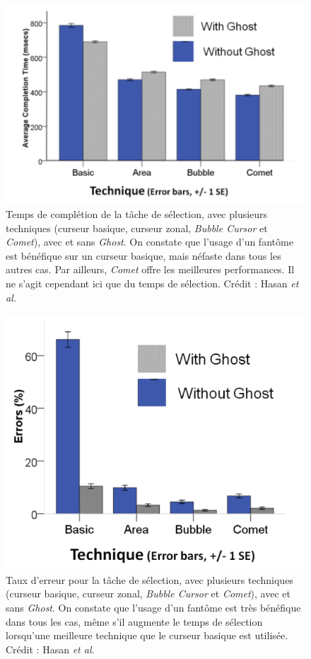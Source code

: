 	\begin{figure}[ht]
		\centering
		\includegraphics[width=\textwidth]{figures/cometGhostTimes}
		\caption{Temps de complétion de la tâche de sélection, avec plusieurs techniques (curseur basique, curseur zonal, \emph{Bubble Cursor} et \emph{Comet}), avec et sans \emph{Ghost}. On constate que l'usage d'un fantôme est bénéfique sur un curseur basique, mais néfaste dans tous les autres cas. Par ailleurs, \emph{Comet} offre les meilleures performances. Il ne s'agit cependant ici que du temps de sélection. Crédit : Hasan \emph{et al.}}
		\label{fig:cometGhostTimes}
	\end{figure}
	
	\begin{figure}[ht]
		\centering
		\includegraphics[width=\textwidth]{figures/cometGhostErrors}
		\caption{Taux d'erreur pour la tâche de sélection, avec plusieurs techniques (curseur basique, curseur zonal, \emph{Bubble Cursor} et \emph{Comet}), avec et sans \emph{Ghost}. On constate que l'usage d'un fantôme est très bénéfique dans tous les cas, même s'il augmente le temps de sélection lorsqu'une meilleure technique que le curseur basique est utilisée. Crédit : Hasan \emph{et al.}}
		\label{fig:cometGhostErrors}
	\end{figure}
	
